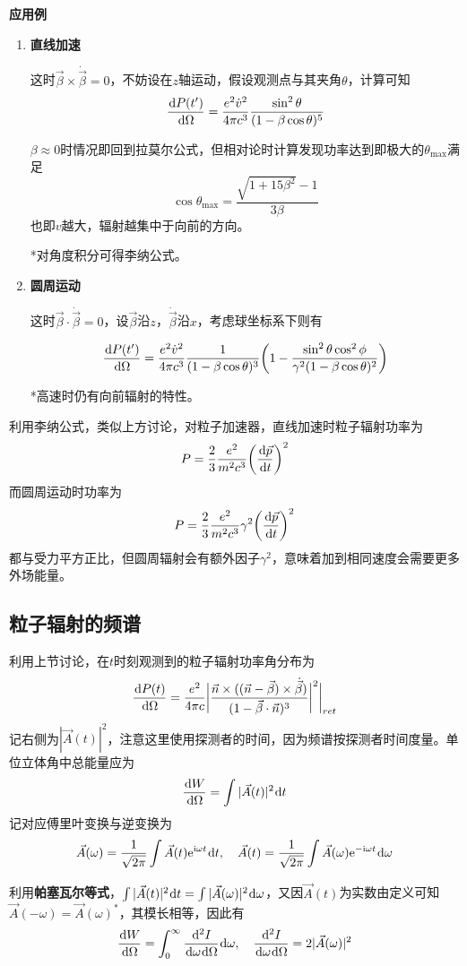 \documentclass[a4paper,UTF8,fontset=windows]{ctexart}
\newcommand*{\dr}{\hspace{0.07em}\mathrm{d}}
\newcommand*{\er}{\mathrm{e}}
\newcommand*{\ir}{\mathrm{i}}
\newcommand*{\va}{\vec{A}}
\newcommand*{\vns}{\vec{n}}
\newcommand*{\vps}{\vec{p}}
\newcommand*{\vbeta}{\vec{\beta}}
\newcommand*{\dt}[2][t]{\frac{\dr #2}{\dr #1}}
\begin{document}
\textbf{应用例}
\begin{enumerate}
    \item \textbf{直线加速}
    
    这时$\vbeta\times\dot{\vbeta}=0$，不妨设在$z$轴运动，假设观测点与其夹角$\theta$，计算可知
    $$\dt[\Omega]{P(t')}=\frac{e^2\dot{v}^2}{4\pi c^3}\frac{\sin^2\theta}{(1-\beta\cos\theta)^5}$$

    $\beta\approx0$时情况即回到拉莫尔公式，但相对论时计算发现功率达到即极大的$\theta_{\max}$满足
    $$\cos\theta_{\max}=\frac{\sqrt{1+15\beta^2}-1}{3\beta}$$
    也即$v$越大，辐射越集中于向前的方向。

    *对角度积分可得李纳公式。

    \item \textbf{圆周运动}

    这时$\vbeta\cdot\dot{\vbeta}=0$，设$\vbeta$沿$z$，$\dot{\vbeta}$沿$x$，考虑球坐标系下则有

    $$\dt[\Omega]{P(t')}=\frac{e^2\dot{v}^2}{4\pi c^3}\frac{1}{(1-\beta\cos\theta)^3}\bigg(1-\frac{\sin^2\theta\cos^2\phi}{\gamma^2(1-\beta\cos\theta)^2}\bigg)$$

    *高速时仍有向前辐射的特性。
\end{enumerate}

利用李纳公式，类似上方讨论，对粒子加速器，直线加速时粒子辐射功率为
$$P=\frac{2}{3}\frac{e^2}{m^2c^3}\bigg(\dt{\vps}\bigg)^2$$
而圆周运动时功率为
$$P=\frac{2}{3}\frac{e^2}{m^2c^3}\gamma^2\bigg(\dt{\vps}\bigg)^2$$
都与受力平方正比，但圆周辐射会有额外因子$\gamma^2$，意味着加到相同速度会需要更多外场能量。

\subsection{粒子辐射的频谱}
利用上节讨论，在$t$时刻观测到的粒子辐射功率角分布为
$$\dt[\Omega]{P(t)}=\frac{e^2}{4\pi c}\bigg|\frac{\vns\times((\vns-\vbeta)\times\dot{\vbeta})}{(1-\vbeta\cdot\vns)^3}\bigg|^2\bigg|_{ret}$$
记右侧为$|\va(t)|^2$，注意这里使用探测者的时间，因为频谱按探测者时间度量。单位立体角中总能量应为
$$\dt[\Omega]{W}=\int|\va(t)|^2\dr t$$
记对应傅里叶变换与逆变换为
$$\va(\omega)=\frac{1}{\sqrt{2\pi}}\int\va(t)\er^{\ir\omega t}\dr t,\quad\va(t)=\frac{1}{\sqrt{2\pi}}\int\va(\omega)\er^{-\ir\omega t}\dr\omega$$

利用\textbf{帕塞瓦尔等式}，$\int|\va(t)|^2\dr t=\int|\va(\omega)|^2\dr\omega$，又因$\va(t)$为实数由定义可知$\va(-\omega)=\va(\omega)^*$，其模长相等，因此有
$$\dt[\Omega]{W}=\int_0^\infty\frac{\dr^2I}{\dr\omega\dr\Omega}\dr\omega,\quad\frac{\dr^2I}{\dr\omega\dr\Omega}=2|\va(\omega)|^2$$
\end{document}
